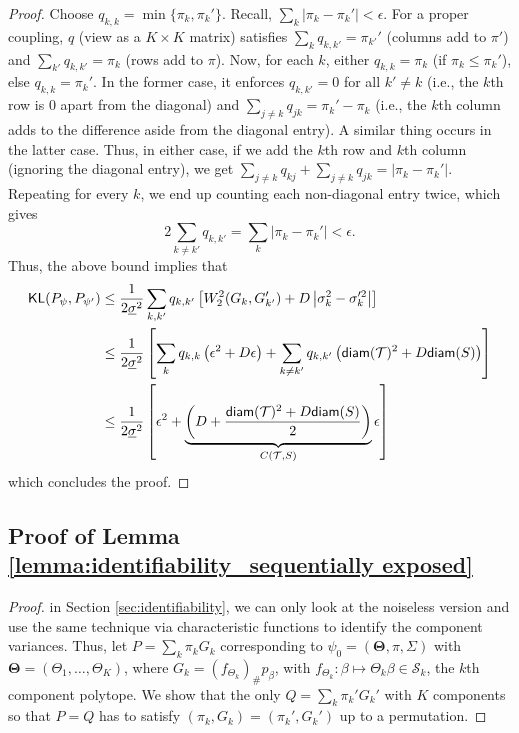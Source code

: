 \documentclass[bj,authoryear]{imsart}
\theoremstyle{plain}
\theoremstyle{remark}
\def\bTheta{{\boldsymbol\Theta}}
\def\cS{\mathcal{S}}
\def\cT{\mathcal{T}}
\def\diam{{\sf diam}}
\def\KL{{\sf KL}}
\def\bTheta{\boldsymbol{\Theta}}
\begin{document}
\begin{appendix}
\begin{proof}
    Choose $q_{k,k}=\min \{\pi_k, \pi_{k}'\}$. Recall, $\sum_k |\pi_k - \pi_k'|<\epsilon$. For a proper coupling, $q$ (view as a $K\times K$ matrix) satisfies $\sum_k q_{k,k'}=\pi_{k'}'$  (columns add to $\pi'$) and $\sum_{k'} q_{k,k'} = \pi_k$ (rows add to $\pi$). Now, for each $k$, either $q_{k,k}=\pi_k$ (if $\pi_k\leq \pi_k'$), else $q_{k,k}=\pi_{k}'$. In the former case, it enforces $q_{k,k'}=0$ for all $k'\neq k$ (i.e., the $k$th row is 0 apart from the diagonal) and $\sum_{j\neq k} q_{jk} = \pi_k'-\pi_k$ (i.e., the $k$th column adds to the difference aside from the diagonal entry). A similar thing occurs in the latter case. Thus, in either case, if we add the $k$th row and $k$th column (ignoring the diagonal entry), we get
    $\sum_{j\neq k} q_{kj} + \sum_{j\neq k} q_{jk} = |\pi_k - \pi_k'|$.
    Repeating for every $k$, we end up counting each non-diagonal entry twice, which gives
    $$2\sum_{k\neq k'} q_{k,k'} = \sum_k |\pi_k - \pi_k'| < \epsilon.$$
     Thus, the above bound implies that
    \begin{align*}
        \KL(P_{\psi},P_{\psi'}) &\leq \frac{1}{2 \underline{\sigma}^2}\sum_{k,k'} q_{k,k'} \left[W_2^2(G_k, G_{k'}') + D\left|\sigma_k^2 - \sigma_k'^2\right|\right] \\
        &\leq \frac{1}{2\underline{\sigma}^2}\left[\sum_k q_{k,k} \left(\epsilon^2 + D\epsilon\right) + \sum_{k\neq k'} q_{k,k'} \left(\diam(\cT)^2+D\diam(S)\right)\right] \\
        &\leq\frac{1}{2\underline{\sigma}^2} \left[\epsilon^2 + \underbrace{\left(D + \frac{\diam(\cT)^2+D\diam(S)}{2}\right)}_{C(\cT,S)}\epsilon\right]
    \end{align*}
    which concludes the proof.
\end{proof}

\subsection{Proof of Lemma \ref{lemma:identifiability_sequentially exposed}}\label{app:proof_lemma_identifiability_sequentially exposed}

\begin{proof} in Section 
\ref{sec:identifiability}, we can only look at the noiseless version and use the same technique via characteristic functions to identify the component variances. Thus, let $P=\sum_k \pi_k G_k$ corresponding to $\psi_0=(\bTheta,\pi,\Sigma)$ with $\bTheta=(\Theta_1,\dots,\Theta_K)$, where $G_k=(f_{\Theta_k})_{\#}p_{\beta}$, with $f_{\Theta_k}:\beta \mapsto \Theta_k\beta\in \cS_k$, the $k$th component polytope. We show that the only $Q=\sum_k \pi_k' G_k'$ with $K$ components so that $P=Q$ has to satisfy $(\pi_k, G_k) = (\pi_k', G_k')$ up to a permutation.


\end{proof}
\end{appendix}
\end{document}
